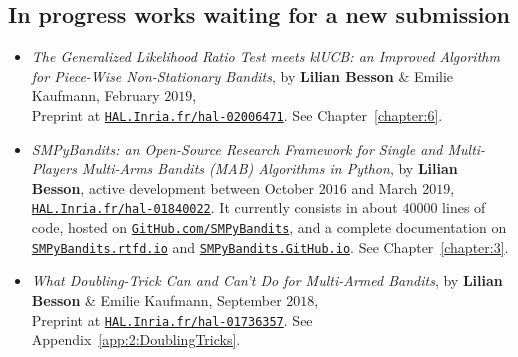 \subsection*{In progress works waiting for a new submission}

\begin{itemize}

\item
    \emph{The Generalized Likelihood Ratio Test meets klUCB: an Improved Algorithm for Piece-Wise Non-Stationary Bandits},
    by \textbf{Lilian Besson} \& Emilie Kaufmann,
    February $2019$,\\
    Preprint at \href{https://HAL.Inria.fr/hal-02006471}{\texttt{HAL.Inria.fr/hal-02006471}}.
    See Chapter~\ref{chapter:6}.
    \cite{Besson2019GLRT}

\item
    \emph{SMPyBandits: an Open-Source Research Framework for Single and Multi-Players Multi-Arms Bandits (MAB) Algorithms in Python},
    by \textbf{Lilian Besson}, active development between October $2016$ and March $2019$,
    \href{https://HAL.Inria.fr/hal-01840022}{\texttt{HAL.Inria.fr/hal-01840022}}.
    It currently consists in about $40000$ lines of code, hosted on \href{https://GitHub.com/SMPyBandits}{\texttt{GitHub.com/SMPyBandits}},
    and a complete documentation on \href{https://SMPyBandits.rtfd.io}{\texttt{SMPyBandits.rtfd.io}} and \href{https://SMPyBandits.GitHub.io}{\texttt{SMPyBandits.GitHub.io}}.
    See Chapter~\ref{chapter:3}.
    \cite{SMPyBandits,SMPyBanditsJMLR}

\item
    \emph{What Doubling-Trick Can and Can't Do for Multi-Armed Bandits},
    by \textbf{Lilian Besson} \& Emilie Kaufmann,
    September $2018$,\\
    Preprint at \href{https://HAL.Inria.fr/hal-01736357}{\texttt{HAL.Inria.fr/hal-01736357}}.
    See Appendix~\ref{app:2:DoublingTricks}.
    \cite{Besson2018DoublingTricks}

\end{itemize}




